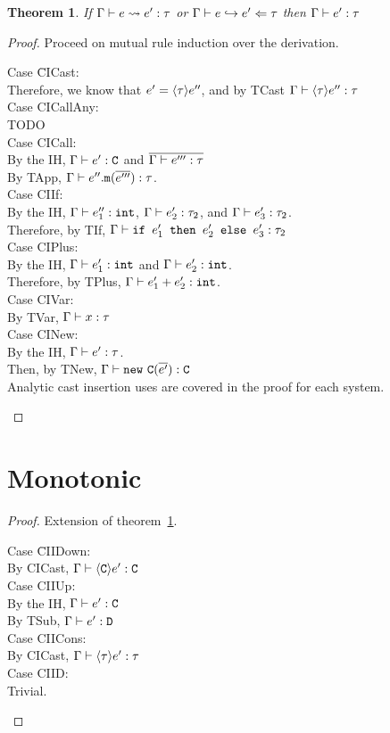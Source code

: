 \documentclass{report}
\newtheorem{thm}{Theorem}
\begin{document}
\begin{thm} 
\label{cisnd}If $\Gamma\vdash e \rightsquigarrow e' : \tau$ or $\Gamma\vdash e\hookrightarrow e' \Leftarrow \tau$ then $\Gamma\vdash e' : \tau$\end{thm}
\begin{proof}
Proceed on mutual rule induction over the derivation.
\begin{tabbing}
Case \=CICast:\\
\> Therefore, we know that $e' = \langle \tau\rangle e''$, and by TCast $\Gamma\vdash \langle \tau\rangle e'' : \tau$\\
Case CICallAny:\\
\> TODO\\
Case CICall:\\
\> By the IH, $\Gamma\vdash e' : \texttt{C}$ and $\overline{ \Gamma\vdash e''' : \tau} $\\
\> By TApp, $\Gamma\vdash e''.\texttt{m}(\overline{ e'''} ) : \tau$.\\
Case CIIf:\\
\> By the IH, $\Gamma\vdash e_1'' : \texttt{int}$, $\Gamma\vdash e_2' : \tau_2$, and $\Gamma\vdash e_3' : \tau_2$.\\
\> Therefore, by TIf, $\Gamma\vdash \texttt{if }e_1'\texttt{ then }e_2'\texttt{ else }e_3' : \tau_2$\\
Case CIPlus:\\
\> By the IH, $\Gamma\vdash e_1' : \texttt{int}$ and $\Gamma\vdash e_2' : \texttt{int}$.\\
\> Therefore, by TPlus, $\Gamma\vdash e_1' + e_2' : \texttt{int}$.\\
Case CIVar:\\
\> By TVar, $\Gamma\vdash x:\tau$\\
Case CINew:\\
\> By the IH, $\Gamma\vdash e' : \tau$.\\
\> Then, by TNew, $\Gamma\vdash  \texttt{new} ~ \texttt{C} ( \overline{ e'}  ) : \texttt{C}$ \\
Analytic cast insertion uses are covered in the proof for each system.\\
\end{tabbing}
\end{proof}


\section{Monotonic}

\begin{proof}

Extension of theorem~\ref{cisnd}.
\begin{tabbing}
Case \=CIIDown:\\
\> By CICast, $\Gamma\vdash \langle \texttt{C}\rangle e' : \texttt{C}$\\
Case CIIUp:\\
\> By the IH, $\Gamma\vdash e' : \texttt{C}$\\
\> By TSub, $\Gamma\vdash e' : \texttt{D}$\\
Case CIICons:\\
\> By CICast, $\Gamma\vdash \langle \tau\rangle e' : \tau$\\
Case CIID:\\
\> Trivial.\\
\end{tabbing}
\end{proof}
\end{document}
